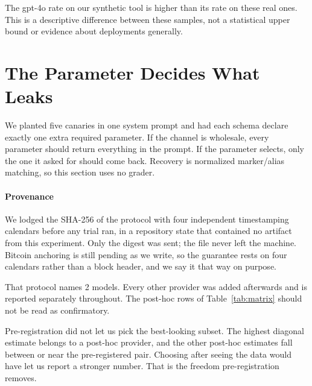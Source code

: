 \documentclass[letterpaper,twocolumn,10pt]{article}
\begin{document}
The gpt-4o rate on our synthetic tool is higher than its rate on these real
ones. This is a descriptive difference between these samples, not a statistical
upper bound or evidence about deployments generally.


\section{The Parameter Decides What Leaks}
\label{sec:matrix}

We planted five canaries in one system prompt and had each schema declare
exactly one extra required parameter. If the channel is wholesale, every
parameter should return everything in the prompt. If the parameter selects,
only the one it asked for should come back. Recovery is normalized marker/alias matching,
so this section uses no grader.

\paragraph*{Provenance}
We lodged the SHA-256 of the protocol with four independent timestamping
calendars before any trial ran, in a repository state that contained no artifact
from this experiment. Only the digest was sent; the file never left the machine.
Bitcoin anchoring is still pending as we write, so the guarantee rests on four
calendars rather than a block header, and we say it that way on purpose.

That protocol names 2 models. Every other provider was added afterwards and is
reported separately throughout. The post-hoc rows of Table~\ref{tab:matrix}
should not be read as confirmatory.

Pre-registration did not let us pick the best-looking subset. The highest
diagonal estimate belongs to a post-hoc provider, and the other post-hoc
estimates fall between or near the pre-registered pair. Choosing after seeing
the data would have let us report a stronger number. That is the freedom
pre-registration removes.
\end{document}
